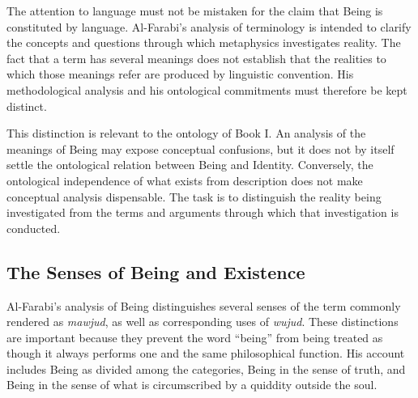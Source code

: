 \label{para:VS.B01.P01.C08.S12.SS03.P003}

The attention to language must not be mistaken
for the claim that Being is constituted by
language. Al-Farabi's analysis of terminology
is intended to clarify the concepts and
questions through which metaphysics investigates
reality. The fact that a term has several
meanings does not establish that the realities
to which those meanings refer are produced
by linguistic convention. His methodological
analysis and his ontological commitments
must therefore be kept distinct.

\label{para:VS.B01.P01.C08.S12.SS03.P004}

This distinction is relevant to the ontology
of Book I. An analysis of the meanings of
Being may expose conceptual confusions,
but it does not by itself settle the
ontological relation between Being and
Identity. Conversely, the ontological
independence of what exists from description
does not make conceptual analysis dispensable.
The task is to distinguish the reality
being investigated from the terms and
arguments through which that investigation
is conducted.



\subsection{The Senses of Being and Existence}
\label{subsec:ch08-farabi-being-existence}

\label{para:VS.B01.P01.C08.S12.SS04.P001}

Al-Farabi's analysis of Being distinguishes
several senses of the term commonly rendered
as \textit{mawjud}, as well as corresponding
uses of \textit{wujud}. These distinctions
are important because they prevent the
word ``being'' from being treated as though
it always performs one and the same
philosophical function. His account includes
Being as divided among the categories,
Being in the sense of truth, and Being
in the sense of what is circumscribed by
a quiddity outside the soul.
\citep[sec.~3.4]{MennAlFarabiMetaphysicsSEP2026}

\label{para:VS.B01.P01.C08.S12.SS04.P002}

